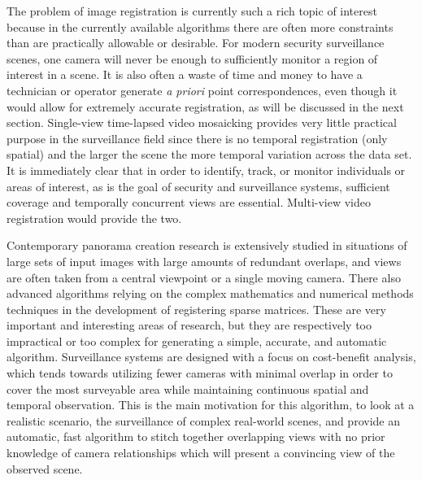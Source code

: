 %
%
%
%
%
%

%
%
%


The problem of image registration is currently such a rich topic of interest because in the currently available algorithms there are often more constraints than are practically allowable or desirable. For modern security surveillance scenes, one camera will never be enough to sufficiently monitor a region of interest in a scene. It is also often a waste of time and money to have a technician or operator generate \textit{a priori} point correspondences, even though it would allow for extremely accurate registration, as will be discussed in the next section. Single-view time-lapsed video mosaicking provides very little practical purpose in the surveillance field since there is no temporal registration (only spatial) and the larger the scene the more temporal variation across the data set. It is immediately clear that in order to identify, track, or monitor individuals or areas of interest, as is the goal of security and surveillance systems, sufficient coverage and temporally concurrent views are essential. Multi-view video registration would provide the two.

Contemporary panorama creation research is extensively studied in situations of large sets of input images with large amounts of redundant overlaps, and views are often taken from a central viewpoint or a single moving camera. There also advanced algorithms relying on the complex mathematics and numerical methods techniques in the development of registering sparse matrices. These are very important and interesting areas of research, but they are respectively too impractical or too complex for generating a simple, accurate, and automatic algorithm. Surveillance systems are designed with a focus on cost-benefit analysis, which tends towards utilizing fewer cameras with minimal overlap in order to cover the most surveyable area while maintaining continuous spatial and temporal observation. This is the main motivation for this algorithm, to look at a realistic scenario, the surveillance of complex real-world scenes, and provide an automatic, fast algorithm to stitch together overlapping views with no prior knowledge of camera relationships which will present a convincing view of the observed scene.

